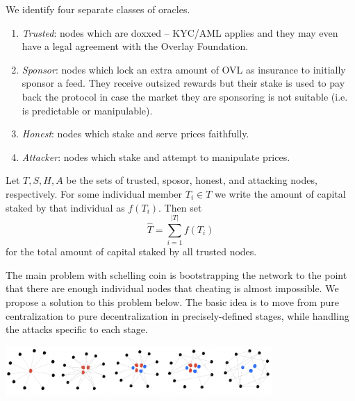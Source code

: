 \documentclass[11pt]{article}
\begin{document}
 We identify four separate classes of oracles. 
 \begin{enumerate}
	 \item {\it Trusted}: nodes which are doxxed -- KYC/AML applies  and they may even have a legal agreement with the Overlay Foundation.  
	 \item {\it Sponsor}: nodes which lock an extra amount of OVL as insurance to initially sponsor a feed. They receive outsized rewards but their stake is used to pay back the protocol in case the market they are sponsoring is not suitable (i.e. is predictable or manipulable).
	 \item {\it Honest}: nodes which stake and serve prices faithfully. 
	 \item {\it Attacker}: nodes which stake and attempt to manipulate prices.  
 \end{enumerate}
 Let $T, S, H, A$ be the sets of trusted, sposor, honest, and attacking nodes, respectively. For some individual member $T_i \in T$ we write the amount of capital staked by that individual as $f(T_i)$. Then set 
 \[\hat{T} = \sum_{i=1}^{|T|} f(T_i)\]
 for the total amount of capital staked by all trusted nodes. 

 The main problem with schelling coin is bootstrapping the network to the point that there are enough individual nodes that cheating is almost impossible. We propose a solution to this problem below. The basic idea is to move from pure centralization to pure decentralization in  precisely-defined stages, while handling the attacks specific to each stage.



 \begin{center}
	 \includegraphics[width=4in]{progression.png}
 \end{center}
\end{document}
